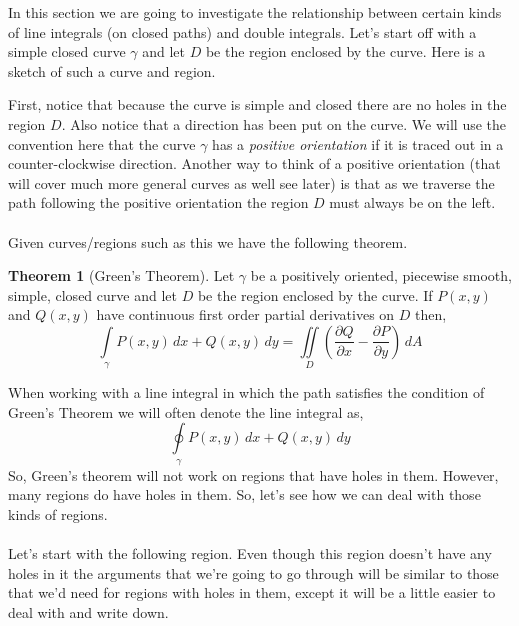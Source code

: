 \documentclass[10pt,reqno]{book}
\theoremstyle{definition}
\newtheorem{theorem}{Theorem}[section]
\begin{document}
 	In this section we are going to investigate the relationship between certain kinds of line integrals (on closed paths) and double integrals. Let's start off with a simple closed curve $ \gamma $ and let $ D $ be the region enclosed by the curve. Here is a sketch of such a curve and region.
	\begin{center}
	\end{center}
	First, notice that because the curve is simple and closed there are no holes in the region $ D $. Also notice that a direction has been put on the curve. We will use the convention here that the curve $ \gamma $ has a \textit{positive orientation} if it is traced out in a counter-clockwise direction. Another way to think of a positive orientation (that will cover much more general curves as well see later) is that as we traverse the path following the positive orientation the region $ D $ must always be on the left.\\ \\
	Given curves/regions such as this we have the following theorem.
	\begin{theorem}[Green's Theorem]
		Let $ \gamma $ be a positively oriented, piecewise smooth, simple, closed curve and let $ D $ be the region enclosed by the curve. If $ P(x,y) $ and $ Q(x,y) $ have continuous first order partial derivatives on $ D $ then,
		\[ \int\limits_{\gamma} P(x,y)\,dx + Q(x,y)\,dy = \iint\limits_D \left( \frac{\partial Q}{\partial x} - \frac{\partial P}{\partial y} \right)\,dA \]
	\end{theorem}
	\noindent When working with a line integral in which the path satisfies the condition of Green's Theorem we will often denote the line integral as,
	\[ \oint\limits_{\gamma} P(x,y)\,dx + Q(x,y)\,dy \]
	So, Green's theorem will not work on regions that have holes in them. However, many regions do have holes in them. So, let's see how we can deal with those kinds of regions.\\ \\
	Let's start with the following region. Even though this region doesn't have any holes in it the arguments that we're going to go through will be similar to those that we'd need for regions with holes in them, except it will be a little easier to deal with and write down.
\end{document}
